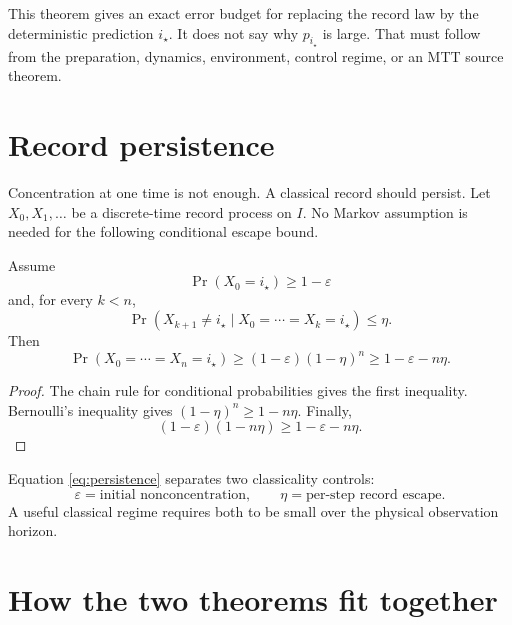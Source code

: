 \documentclass[11pt]{article}
\begin{document}
This theorem gives an exact error budget for replacing the record law by the
deterministic prediction \(i_\star\). It does not say why
\(p_{i_\star}\) is large. That must follow from the preparation, dynamics,
environment, control regime, or an MTT source theorem.

\section{Record persistence}

Concentration at one time is not enough. A classical record should persist.
Let \(X_0,X_1,\ldots\) be a discrete-time record process on \(I\). No Markov
assumption is needed for the following conditional escape bound.

\begin{theorem}
Assume
\[
\Pr(X_0=i_\star)\geq1-\varepsilon
\]
and, for every \(k<n\),
\[
\Pr\!\left(
X_{k+1}\neq i_\star
\mid X_0=\cdots=X_k=i_\star
\right)
\leq\eta.
\]
Then
\begin{equation}
\Pr(X_0=\cdots=X_n=i_\star)
\geq(1-\varepsilon)(1-\eta)^n
\geq1-\varepsilon-n\eta.
\label{eq:persistence}
\end{equation}
\end{theorem}

\begin{proof}
The chain rule for conditional probabilities gives the first inequality.
Bernoulli's inequality gives \((1-\eta)^n\geq1-n\eta\). Finally,
\[
(1-\varepsilon)(1-n\eta)
\geq1-\varepsilon-n\eta.
\]
\end{proof}

Equation \eqref{eq:persistence} separates two classicality controls:
\[
\varepsilon
=\text{initial nonconcentration},
\qquad
\eta
=\text{per-step record escape}.
\]
A useful classical regime requires both to be small over the physical
observation horizon.

\section{How the two theorems fit together}
\end{document}

